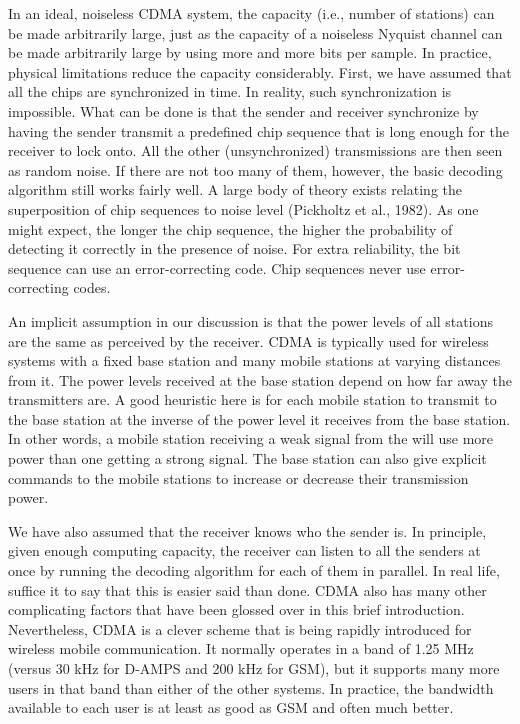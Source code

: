 \documentclass[b5paper,11pt]{memoir}
\begin{document}
In an ideal, noiseless CDMA system, the capacity (i.e., number of
stations) can be made arbitrarily large, just as the capacity of a
noiseless Nyquist channel can be made arbitrarily large by using more
and more bits per sample. In practice, physical limitations reduce the
capacity considerably. First, we have assumed that all the chips are
synchronized in time. In reality, such synchronization is impossible.
What can be done is that the sender and receiver synchronize by having
the sender transmit a predefined chip sequence that is long enough for
the receiver to lock onto. All the other (unsynchronized) transmissions
are then seen as random noise. If there are not too many of them,
however, the basic decoding algorithm still works fairly well. A large
body of theory exists relating the superposition of chip sequences to
noise level (Pickholtz et al., 1982). As one might expect, the longer
the chip sequence, the higher the probability of detecting it correctly
in the presence of noise. For extra reliability, the bit sequence can
use an error-correcting code. Chip sequences never use error-correcting
codes.

An implicit assumption in our discussion is that the power levels of all
stations are the same as perceived by the receiver. CDMA is typically
used for wireless systems with a fixed base station and many mobile
stations at varying distances from it. The power levels received at the
base station depend on how far away the transmitters are. A good
heuristic here is for each mobile station to transmit to the base
station at the inverse of the power level it receives from the base
station. In other words, a mobile station receiving a weak signal from
the will use more power than one getting a strong signal. The base
station can also give explicit commands to the mobile stations to
increase or decrease their transmission power.

We have also assumed that the receiver knows who the sender is. In
principle, given enough computing capacity, the receiver can listen to
all the senders at once by running the decoding algorithm for each of
them in parallel. In real life, suffice it to say that this is easier
said than done. CDMA also has many other complicating factors that have
been glossed over in this brief introduction. Nevertheless, CDMA is a
clever scheme that is being rapidly introduced for wireless mobile
communication. It normally operates in a band of 1.25 MHz (versus 30 kHz
for D-AMPS and 200 kHz for GSM), but it supports many more users in that
band than either of the other systems. In practice, the bandwidth
available to each user is at least as good as GSM and often much better.
\end{document}

